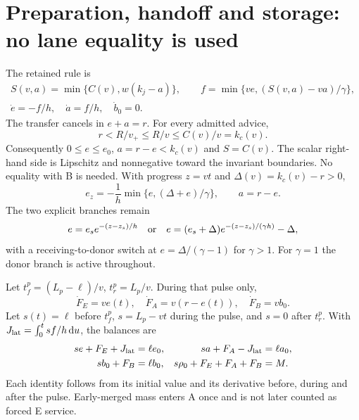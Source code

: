 \documentclass[11pt,a4paper]{article}
\newcommand{\dd}{\,\mathrm d}
\newcommand{\kc}{k_c}
\begin{document}
\section{Preparation, handoff and storage: no lane equality is used}
The retained rule is
\begin{equation}
 \begin{gathered}
 S(v,a)=\min\{C(v),w(k_j-a)\},\qquad
 f=\min\{ve,(S(v,a)-va)/\gamma\},\\
 \dot e=-f/h,\quad\dot a=f/h,\quad\dot b_0=0.
 \end{gathered}
 \label{eq:h1}
\end{equation}
The transfer cancels in $e+a=r$. For every admitted advice,
\begin{equation}
 r<R/v_+\leq R/v\leq C(v)/v=\kc(v).
 \label{eq:free}
\end{equation}
Consequently $0\leq e\leq e_0$, $a=r-e<\kc(v)$ and $S=C(v)$.
The scalar right-hand side is Lipschitz and nonnegative toward the invariant
boundaries. No equality with B is needed. With progress $z=vt$ and
$\Delta(v)=\kc(v)-r>0$,
\begin{equation}
 e_z=-\frac1h\min\{e,(\Delta+e)/\gamma\},\qquad a=r-e.
 \label{eq:progress}
\end{equation}
The two explicit branches remain
\begin{equation}
 e=e_s e^{-(z-z_s)/h}\quad\hbox{or}\quad
 e=(e_s+\Delta)e^{-(z-z_s)/(\gamma h)}-\Delta,
 \label{eq:branches}
\end{equation}
with a receiving-to-donor switch at $e=\Delta/(\gamma-1)$ for
$\gamma>1$. For $\gamma=1$ the donor branch is active throughout.

Let $t_f^p=(L_p-\ell)/v$, $t_r^p=L_p/v$. During that pulse only,
\begin{equation}
 \dot F_E=ve(t),\quad \dot F_A=v(r-e(t)),\quad\dot F_B=vb_0.
 \label{eq:entry}
\end{equation}
Let $s(t)=\ell$ before $t_f^p$, $s=L_p-vt$ during the pulse, and $s=0$
after $t_r^p$. With $J_{\rm lat}=\int_0^t s f/h\dd u$, the balances are
\begin{align}
 se+F_E+J_{\rm lat}&=\ell e_0,&
 sa+F_A-J_{\rm lat}&=\ell a_0,\nonumber\\
 sb_0+F_B&=\ell b_0,&s\rho_0+F_E+F_A+F_B&=M.
 \label{eq:massprep}
\end{align}
Each identity follows from its initial value and its derivative before,
during and after the pulse. Early-merged mass enters A once and is not later
counted as forced E service.
\end{document}
